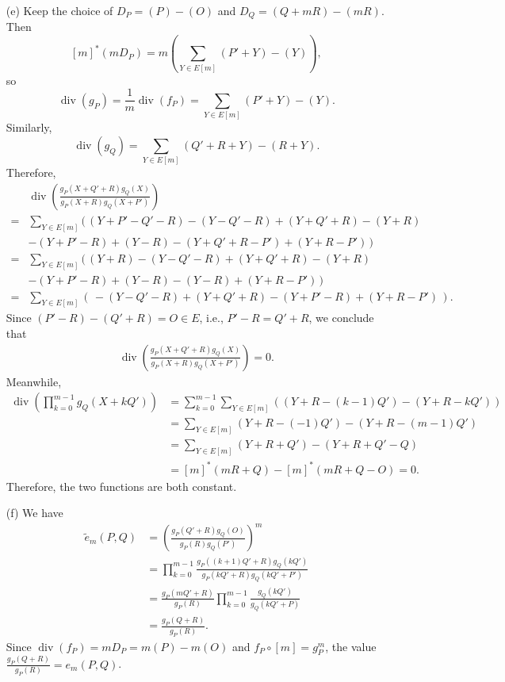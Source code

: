\documentclass{article}
\theoremstyle{definition}
\theoremstyle{remark}
\renewcommand{\div}{\mathop{\mathrm{div}}}
\begin{document}
\begin{enumerate}
\item [(e)]
Keep the choice of $D_P = (P) - (O)$ and $D_Q = (Q+mR) - (mR)$.
Then \[[m]^*(mD_P) = m\left(\sum_{Y\in E[m]} (P' + Y) - (Y)\right),\]
so \[\div(g_P) = \frac{1}{m}\div(f_P) = \sum_{Y\in E[m]} (P' + Y) - (Y).\]
Similarly, \[\div(g_Q) = \sum_{Y\in E[m]} (Q'+R+Y) - (R+Y).\]
Therefore,\begin{align*}
    &\div\left( \frac{g_P(X+Q'+R)g_Q(X)}{g_P(X + R)g_Q(X + P')} \right)\\
    = &\sum_{Y\in E[m]} (\, (Y + P'-Q'-R) - (Y - Q'-R) + (Y+Q'+R) - (Y + R)\\
    & - (Y + P' - R) + (Y-R) - (Y + Q'+R-P') + (Y + R - P') \,)\\
    = & \sum_{Y\in E[m]} (\, (Y + R) - (Y - Q' - R) + (Y + Q'+R) - (Y + R)\\
    & - (Y + P' - R) + (Y - R) - (Y - R) + (Y + R - P')  \,)\\
    = & \sum_{Y\in E[m]} (\, - (Y - Q' - R) + (Y + Q'+R) - (Y + P' - R) + (Y + R - P')  \,).
\end{align*}
Since $(P' - R) - (Q' + R) = O\in E$, i.e., $P' - R = Q' + R$, we conclude that
\begin{align*}
    \div\left( \frac{g_P(X+Q'+R)g_Q(X)}{g_P(X + R)g_Q(X + P')} \right) = 0.
\end{align*}
Meanwhile, \begin{align*}
    \div\left( \prod_{k = 0}^{m-1}g_Q(X + kQ') \right)
    &= \sum_{k = 0}^{m-1}\sum_{Y\in E[m]} \left( (Y + R - (k-1)Q') - (Y + R - kQ') \right) \\
    &= \sum_{Y\in E[m]}(Y + R - (-1)Q') - (Y + R - (m - 1)Q')\\
    &= \sum_{Y\in E[m]} (Y + R + Q') - (Y + R + Q' - Q)\\
    &= [m]^*(mR + Q) - [m]^* (mR + Q - O) = 0.
\end{align*}
Therefore, the two functions are both constant.

\item [(f)] We have
\begin{align*}
    \tilde{e}_m(P, Q) &=  \left( \frac{g_P(Q' + R)g_Q(O)}{g_P(R)g_Q(P')} \right)^m\\
    &= \prod_{k = 0}^{m-1} \frac{g_P((k+1)Q'+R)g_Q(kQ')}{g_P(kQ' + R)g_Q(kQ' + P')}\\
    &= \frac{g_P(mQ' + R)}{g_P(R)}\prod_{k=0}^{m-1}\frac{g_Q(kQ')}{g_Q(kQ' + P)}\\
    &= \frac{g_P(Q + R)}{g_P(R)}.
\end{align*}
Since $\div(f_P) = mD_P = m(P) - m(O)$ and
$f_P\circ [m] = g_P^m$, the value $\frac{g_P(Q + R)}{g_P(R)} = e_m(P, Q)$.

\end{enumerate}
\end{document}
